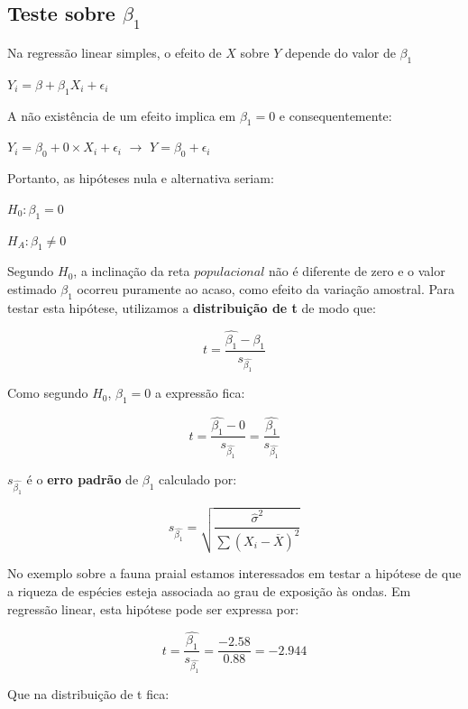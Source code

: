 \documentclass[
]{book}
\begin{document}
\hypertarget{teste-sobre-beta_1}{%
\subsection{\texorpdfstring{Teste sobre \(\beta_1\)}{Teste sobre \textbackslash beta\_1}}\label{teste-sobre-beta_1}}

Na regressão linear simples, o efeito de \(X\) sobre \(Y\) depende do valor de \(\beta_1\)

\(Y_i = \beta + \beta_1X_i + \epsilon_i\)

A não existência de um efeito implica em \(\beta_1 = 0\) e consequentemente:

\(Y_i = \beta_0 + 0 \times X_i + \epsilon_i\) \(\rightarrow\) \(Y = \beta_0 + \epsilon_i\)

Portanto, as hipóteses nula e alternativa seriam:

\(H_0: \beta_1 = 0\)

\(H_A: \beta_1 \ne 0\)

Segundo \(H_0\), a inclinação da reta \(populacional\) não é diferente de zero e o valor estimado \(\hat{\beta_1}\) ocorreu puramente ao acaso, como efeito da variação amostral. Para testar esta hipótese, utilizamos a \textbf{distribuição de t} de modo que:

\[t = \frac{\hat{\beta_1} - \beta_1}{s_{\hat{\beta_1}}}\]

Como segundo \(H_0\), \(\beta_1 = 0\) a expressão fica:

\[t = \frac{\hat{\beta_1} - 0}{s_{\hat{\beta_1}}} = \frac{\hat{\beta_1}}{s_{\hat{\beta_1}}}\]

\(s_{\hat{\beta_1}}\) é o \textbf{erro padrão} de \(\beta_1\) calculado por:

\[s_{\hat{\beta_1}} = \sqrt{\frac{\hat{\sigma}^2}{\sum{(X_i-\overline{X})^2}}}\]

No exemplo sobre a fauna praial estamos interessados em testar a hipótese de que a riqueza de espécies esteja associada ao grau de exposição às ondas. Em regressão linear, esta hipótese pode ser expressa por:

\[t = \frac{\hat{\beta_1}}{s_{\hat{\beta_1}}} = \frac{-2.58}{0.88} = -2.944\]

Que na distribuição de t fica:
\end{document}
